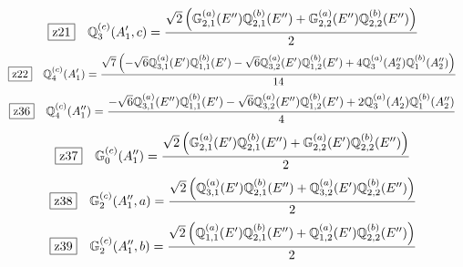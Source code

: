 \documentclass[fleqn,10pt,landscape]{jsarticle}
\begin{document}
\begin{dmath*}
\hspace*{3mm}\fbox{z21}\quad \mathbb{Q}_{3}^{(c)}(A_{1}^{\prime},c)=\frac{\sqrt{2} \left(\mathbb{G}_{2,1}^{(a)}(E^{\prime\prime}) \mathbb{Q}_{2,1}^{(b)}(E^{\prime\prime}) + \mathbb{G}_{2,2}^{(a)}(E^{\prime\prime}) \mathbb{Q}_{2,2}^{(b)}(E^{\prime\prime})\right)}{2}
\end{dmath*}
\begin{dmath*}
\hspace*{3mm}\fbox{z22}\quad \mathbb{Q}_{4}^{(c)}(A_{1}^{\prime})=\frac{\sqrt{7} \left(- \sqrt{6} \mathbb{Q}_{3,1}^{(a)}(E^{\prime}) \mathbb{Q}_{1,1}^{(b)}(E^{\prime}) - \sqrt{6} \mathbb{Q}_{3,2}^{(a)}(E^{\prime}) \mathbb{Q}_{1,2}^{(b)}(E^{\prime}) + 4 \mathbb{Q}_{3}^{(a)}(A_{2}^{\prime\prime}) \mathbb{Q}_{1}^{(b)}(A_{2}^{\prime\prime})\right)}{14}
\end{dmath*}
\begin{dmath*}
\hspace*{3mm}\fbox{z36}\quad \mathbb{Q}_{4}^{(c)}(A_{1}^{\prime\prime})=\frac{- \sqrt{6} \mathbb{Q}_{3,1}^{(a)}(E^{\prime\prime}) \mathbb{Q}_{1,1}^{(b)}(E^{\prime}) - \sqrt{6} \mathbb{Q}_{3,2}^{(a)}(E^{\prime\prime}) \mathbb{Q}_{1,2}^{(b)}(E^{\prime}) + 2 \mathbb{Q}_{3}^{(a)}(A_{2}^{\prime}) \mathbb{Q}_{1}^{(b)}(A_{2}^{\prime\prime})}{4}
\end{dmath*}
\begin{dmath*}
\hspace*{3mm}\fbox{z37}\quad \mathbb{G}_{0}^{(c)}(A_{1}^{\prime\prime})=\frac{\sqrt{2} \left(\mathbb{G}_{2,1}^{(a)}(E^{\prime}) \mathbb{Q}_{2,1}^{(b)}(E^{\prime\prime}) + \mathbb{G}_{2,2}^{(a)}(E^{\prime}) \mathbb{Q}_{2,2}^{(b)}(E^{\prime\prime})\right)}{2}
\end{dmath*}
\begin{dmath*}
\hspace*{3mm}\fbox{z38}\quad \mathbb{G}_{2}^{(c)}(A_{1}^{\prime\prime},a)=\frac{\sqrt{2} \left(\mathbb{Q}_{3,1}^{(a)}(E^{\prime}) \mathbb{Q}_{2,1}^{(b)}(E^{\prime\prime}) + \mathbb{Q}_{3,2}^{(a)}(E^{\prime}) \mathbb{Q}_{2,2}^{(b)}(E^{\prime\prime})\right)}{2}
\end{dmath*}
\begin{dmath*}
\hspace*{3mm}\fbox{z39}\quad \mathbb{G}_{2}^{(c)}(A_{1}^{\prime\prime},b)=\frac{\sqrt{2} \left(\mathbb{Q}_{1,1}^{(a)}(E^{\prime}) \mathbb{Q}_{2,1}^{(b)}(E^{\prime\prime}) + \mathbb{Q}_{1,2}^{(a)}(E^{\prime}) \mathbb{Q}_{2,2}^{(b)}(E^{\prime\prime})\right)}{2}
\end{dmath*}
\end{document}
